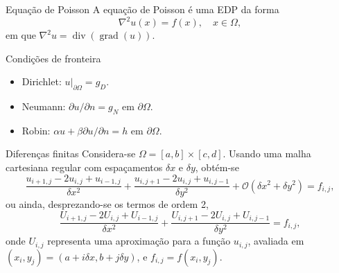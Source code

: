 \documentclass[../main/main.tex]{subfiles}
\begin{document}

\begin{frame}{Equação de Poisson}
	A equação de Poisson é uma EDP da forma\[
		\nabla^2 u(x) = f(x),\quad x\in\Omega,
	\] em que $\nabla^2 u = \operatorname{div}(\operatorname{grad}(u))$.
\end{frame}

\begin{frame}{Condições de fronteira}
	\begin{itemize}
		\item Dirichlet: $u|_{\partial\Omega} = g_D$.
		\item Neumann: $\partial u/\partial n = g_N$ em $\partial\Omega$.
		\item Robin: $\alpha u + \beta\partial u/\partial n = h$ em $\partial\Omega$.
	\end{itemize}
\end{frame}

\begin{frame}{Diferenças finitas}
	Considera-se $\Omega = [a,b]\times[c,d]$. Usando uma malha cartesiana regular com espaçamentos $\delta x$ e $\delta y$, obtém-se\[
		\frac{u_{i+1,j}-2u_{i,j}+u_{i-1,j}}{\delta x^{2}}+\frac{u_{i,j+1}-2u_{i,j}+u_{i,j-1}}{\delta y^{2}}+\mathcal{O}(\delta x^{2}+\delta y^{2})=f_{i,j},
	\]\pause
	ou ainda, desprezando-se os termos de ordem 2,
	\[
		\frac{U_{i+1,j}-2U_{i,j}+U_{i-1,j}}{\delta x^{2}}+\frac{U_{i,j+1}-2U_{i,j}+U_{i,j-1}}{\delta y^{2}}=f_{i,j},
	\]\pause
	onde $U_{i,j}$ representa uma aproximação para a função $u_{i,j}$, avaliada em $(x_{i},y_{j}) = (a+i\delta x, b+j\delta y)$, e $f_{i,j}=f(x_i, y_j)$.
\end{frame}
\end{document}

